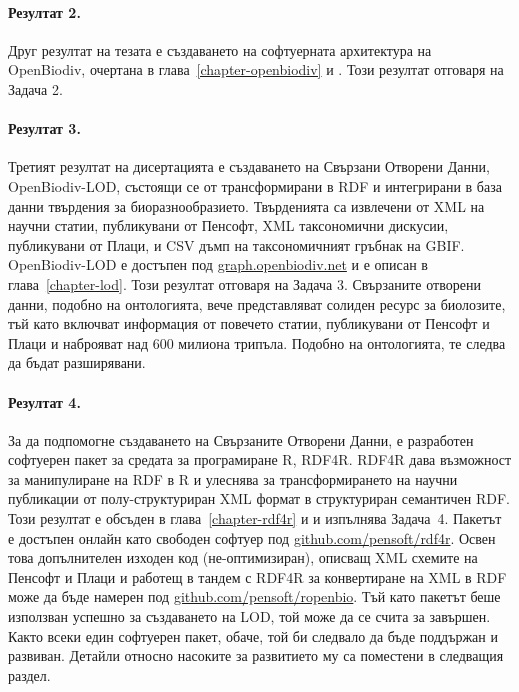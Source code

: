 \paragraph{Резултат 2.} Друг резултат на тезата е създаването на софтуерната архитектура на OpenBiodiv, очертана в глава~\ref{chapter-openbiodiv} и \cite{senderov_open_2016}. Този резултат отговаря на Задача 2.

\paragraph{Резултат 3.} Третият резултат на дисертацията е създаването на Свързани Отворени Данни, OpenBiodiv-LOD, състоящи се от трансформирани в RDF и интегрирани в база данни твърдения за биоразнообразието. Твърденията са извлечени от XML на научни статии, публикувани от Пенсофт, XML таксономични дискусии, публикувани от Плаци, и CSV дъмп на таксономичният гръбнак на GBIF. OpenBiodiv-LOD е достъпен под \href{http://graph.openbiodiv.net}{\url{graph.openbiodiv.net}} и е описан в глава~\ref{chapter-lod}. Този резултат отговаря на Задача 3. Свързаните отворени данни, подобно на онтологията, вече представляват солиден ресурс за биолозите, тъй като включват информация от повечето статии, публикувани от Пенсофт и Плаци и наброяват над 600 милиона трипъла. Подобно на онтологията, те следва да бъдат разширявани.

\paragraph{Резултат 4.} За да подпомогне създаването на Свързаните Отворени Данни, е разработен софтуерен пакет за средата за програмиране R, RDF4R. RDF4R дава възможност за манипулиране на RDF в R и улеснява за трансформирането на научни публикации от полу-структуриран XML формат в структуриран семантичен RDF. Този резултат е обсъден в глава~\ref{chapter-rdf4r} и \cite{senderov_online_2016} и изпълнява Задача~4. Пакетът е достъпен онлайн като свободен софтуер под \href{http://github.com/pensoft/rdf4r}{github.com/pensoft/rdf4r}. Освен това допълнителен изходен код (не-оптимизиран), описващ XML схемите на Пенсофт и Плаци и работещ в тандем с RDF4R за конвертиране на XML в RDF може да бъде намерен под \href{http://github.com/pensoft/ropenbio}{github.com/pensoft/ropenbio}. Тъй като пакетът беше използван успешно за създаването на LOD, той може да се счита за завършен. Както всеки един софтуерен пакет, обаче, той би следвало да бъде поддържан и развиван. Детайли относно насоките за развитието му са поместени в следващия раздел.


